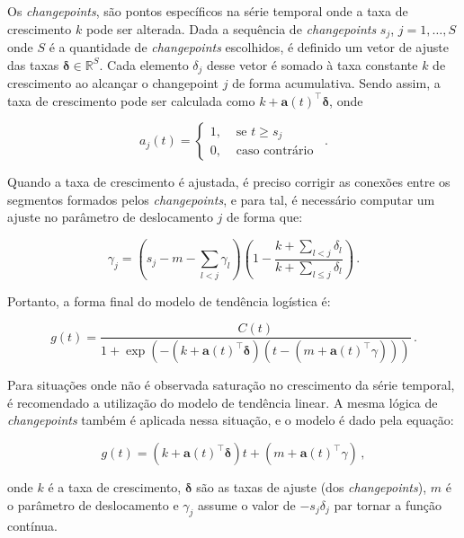 Os \textit{changepoints}, são pontos específicos na série temporal onde a taxa de crescimento $k$ pode ser alterada. Dada a sequência de \textit{changepoints} $s_{j}$, $j=1, \ldots, S$ onde $S$ é a quantidade de \textit{changepoints} escolhidos, é definido um vetor de ajuste das taxas $\boldsymbol{\delta} \in \mathbb{R}^{S}$. Cada elemento $\delta_{j}$ desse vetor é somado à taxa constante $k$ de crescimento ao alcançar o changepoint $j$ de forma acumulativa. Sendo assim, a taxa de crescimento pode ser calculada como $k+\mathbf{a}(t)^{\top} \boldsymbol{\delta}$, onde

\begin{equation}
    a_{j}(t)= \begin{cases}1, & \text { se } t \geq s_{j} \\ 0, & \text { caso contrário }\end{cases}\, .
\end{equation}

Quando a taxa de crescimento é ajustada, é preciso corrigir as conexões entre os segmentos formados pelos \textit{changepoints}, e para tal, é necessário computar um ajuste no parâmetro de deslocamento $j$ de forma que:

\begin{equation}
    \gamma_{j}=\left(s_{j}-m-\sum_{l<j} \gamma_{l}\right)\left(1-\frac{k+\sum_{l<j} \delta_{l}}{k+\sum_{l \leq j} \delta_{l}}\right)\, .
\end{equation}

Portanto, a forma final do modelo de tendência logística é:

\begin{equation}
    g(t)=\frac{C(t)}{1+\exp \left(-\left(k+\mathbf{a}(t)^{\top} \boldsymbol{\delta}\right)\left(t-\left(m+\mathbf{a}(t)^{\top} \gamma\right)\right)\right)}\, .
\end{equation}

Para situações onde não é observada saturação no crescimento da série temporal, é recomendado a utilização do modelo de tendência linear. A mesma lógica de \textit{changepoints} também é aplicada nessa situação, e o modelo é dado pela equação:

\begin{equation}
    g(t)=\left(k+\mathbf{a}(t)^{\top} \boldsymbol{\delta}\right) t+\left(m+\mathbf{a}(t)^{\top} \gamma\right)\, ,
\end{equation}

onde $k$ é a taxa de crescimento, $\boldsymbol{\delta}$ são as taxas de ajuste (dos \textit{changepoints}), $m$ é o parâmetro de deslocamento e $\gamma_{j}$ assume o valor de $-s_{j}\delta_{j}$ par tornar a função contínua.

